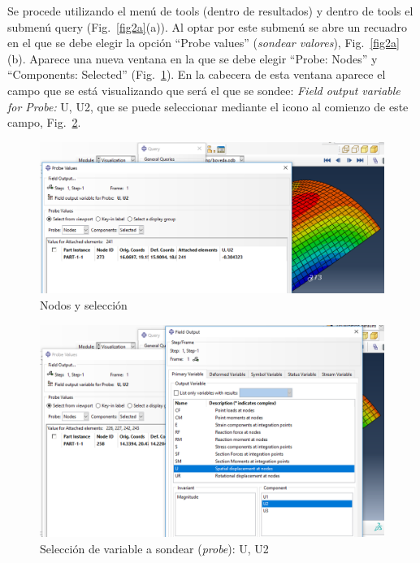\documentclass[spanish,a4paper,12pt]{article}
\begin{document}
Se procede utilizando el menú de tools (dentro de resultados) y dentro de tools el submenú query (Fig.~\ref{fig2a}(a)). Al optar por este submenú 
se abre un recuadro en el que se debe elegir la opción ``Probe values'' (\emph{sondear valores}), 
Fig.~\ref{fig2a}(b).
Aparece una nueva ventana en la que se debe elegir ``Probe: Nodes'' y ``Components: Selected'' (Fig.~\ref{fig5}). En la cabecera de esta ventana aparece el campo que se está visualizando que será el que se sondee: \emph{Field output variable for Probe:}
U, U2, que se puede seleccionar mediante el icono al comienzo de este campo, Fig.~\ref{fig7}.
\begin{figure}[h!tp]
\centering
	\includegraphics[scale=0.45]{capturas2019/a_fig32.png}
	\caption{Nodos y selección}
	\label{fig5}
\end{figure}
\begin{figure}[h!tp]
\centering
	\includegraphics[scale=0.45]{capturas2019/a_fig33.png}
	\caption{Selección de variable a sondear (\emph{probe}): U, U2}
	\label{fig7}
\end{figure}
\end{document}
